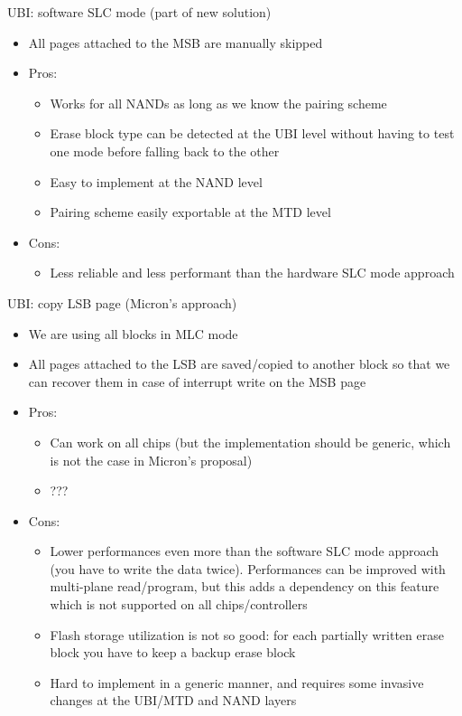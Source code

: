 \documentclass[obeyspaces,spaces,hyphens,dvipsnames]{beamer}
\begin{document}
\begin{frame}{UBI: software SLC mode (part of new solution)}
  \begin{itemize}
  \item All pages attached to the MSB are manually skipped
  \item Pros:
    \begin{itemize}
    \item Works for all NANDs as long as we know the pairing scheme
    \item Erase block type can be detected at the UBI level without
          having to test one mode before falling back to the
	  other
    \item Easy to implement at the NAND level
    \item Pairing scheme easily exportable at the MTD level
    \end{itemize}
  \item Cons:
    \begin{itemize}
    \item Less reliable and less performant than the hardware SLC
          mode approach
    \end{itemize}
  \end{itemize}
\end{frame}

\begin{frame}{UBI: copy LSB page (Micron's approach)}
  \begin{itemize}
  \item We are using all blocks in MLC mode
  \item All pages attached to the LSB are saved/copied to another block
        so that we can recover them in case of interrupt write on the
	MSB page
  \item Pros:
    \begin{itemize}
    \item Can work on all chips (but the implementation should be
          generic, which is not the case in Micron's proposal)
    \item ???
    \end{itemize}
  \item Cons:
    \begin{itemize}
    \item Lower performances even more than the software SLC mode
          approach (you have to write the data twice). Performances
	  can be improved with multi-plane read/program, but this adds
	  a dependency on this feature which is not supported on all
	  chips/controllers
    \item Flash storage utilization is not so good: for each partially
          written erase block you have to keep a backup erase block
    \item Hard to implement in a generic manner, and requires some
          invasive changes at the UBI/MTD and NAND layers
    \end{itemize}
  \end{itemize}
\end{frame}
\end{document}

